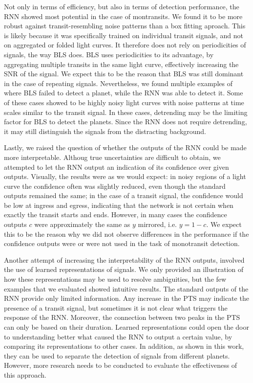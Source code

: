 Not only in terms of efficiency, but also in terms of detection performance, the RNN showed most potential in the case of montransits. We found it to be more robust against transit-resembling noise patterns than a box fitting aproach. This is likely because it was specifically trained on individual transit signals, and not on aggregated or folded light curves. It therefore does not rely on periodicities of signals, the way BLS does. BLS uses periodicities to its advantage,  by aggregating multiple transits in the same light curve, effectively increasing the SNR of the signal. We expect this to be the reason that BLS was still dominant in the case of repeating signals. Nevertheless, we found multiple examples of where BLS failed to detect a planet, while the RNN was able to detect it. Some of these cases showed to be highly noisy light curves with noise patterns at time scales similar to the transit signal. In these cases, detrending may be the limiting factor for BLS to detect the planets. Since the RNN does not require detrending, it may still distinguish the signals from the distracting background.

Lastly, we raised the question of whether the outputs of the RNN could be made more interpretable. Althoug true uncertainties are difficult to obtain, we attempted to let the RNN output an indication of its confidence over given outputs. Visually, the results were as we would expect: in noisy regions of a light curve the confidence often was slightly reduced, even though the standard outputs remained the same; in the case of a transit signal, the confidence would be low at ingress and egress, indicating that the network is not certain when exactly the transit starts and ends. However, in many cases the confidence outputs $c$ were approximately the same as $y$ mirrored, i.e. $y = 1-c$. We expect this to be the reason why we did not observe differences in the performance if the confidence outputs were or were not used in the task of monotransit detection.

Another attempt of increasing the interpretability of the RNN outputs, involved the use of learned representations of signals. We only provided an illustration of how these representations may be used to resolve ambiguities, but the few examples that we evaluated showed intuitive results. The standard outputs of the RNN provide only limited information. Any increase in the PTS may indicate the presence of a transit signal, but sometimes it is not clear what triggers the response of the RNN. Moreover, the connection between two peaks in the PTS can only be based on their duration. Learned representations could open the door to understanding better what caused the RNN to output a certain value, by comparing its representations to other cases.  In addition, as shown in this work, they can be used to separate the detection of signals from different planets. However, more research needs to be conducted to evaluate the effectiveness of this approach.
